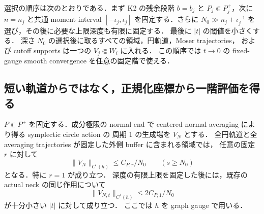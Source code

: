 選択の順序は次のとおりである．まず K2 の残余段階 $b=b_j$ と
$P_j\Subset P_j^+$，次に $n=n_j$ と共通 moment interval
$[-\iota_j,\iota_j]$ を固定する．さらに
$N_0\gg n_j+\iota_j^{-1}$ を選び，その後に必要な上限深度も有限に固定する．
最後に $|t|$ の閾値を小さくする．
深さ $N_0$ の選択後に取るすべての領域，円軌道，Moser trajectories，
および cutoff supports は一つの $V_j\Subset W_i$ に入れる．
この順序では $t\to0$ の fixed-gauge smooth convergence を任意の固定階で使える．

\subsection{短い軌道からではなく，正規化座標から一階評価を得る}

\begin{lemma}
\label{ke:component-normal-generator-c1}
$P\Subset P^+$ を固定する．成分極限の normal end で
centered normal averaging により得る symplectic circle action の
周期 $1$ の生成場を $V_N$ とする．
全円軌道と全 averaging trajectories が固定した外側 buffer に含まれる領域では，
任意の固定 $r$ に対して
\[
 \|V_N\|_{C^r(h)}\le C_{P,r}/N_0\qquad(s\ge N_0)
\]
となる．特に $r=1$ が成り立つ．
深度の有限上限を固定した後には，既存の actual neck の同じ作用について
\[
 \|V_{N,t}\|_{C^1(h)}\le 2C_{P,1}/N_0
\]
が十分小さい $|t|$ に対して成り立つ．
ここでは $h$ を graph gauge で用いる．
\end{lemma}

